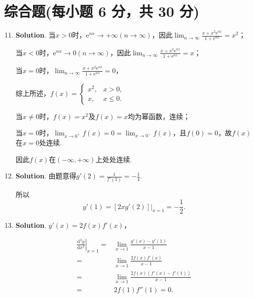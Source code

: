 \documentclass[../main.tex]{subfiles}
\begin{document}
\section{综合题(每小题 6 分，共 30 分)}
\begin{enumerate}
    \setcounter{enumi}{10}
    \item \textbf{Solution}. 当$x>0$时，$\mathrm{e}^{nx}\to+\infty(n\to\infty
              )$，因此$\lim_{n\to\infty}\frac{x+x^{2}\mathrm{e}^{nx}}{1+\mathrm{e}^{nx}}
              =x^{2}$；

          当$x<0$时，$\mathrm{e}^{nx}\to0(n\to\infty)$，因此$\lim_{n\to\infty}\frac{x+x^{2}\mathrm{e}^{nx}}{1+\mathrm{e}^{nx}}
              =x$；

          当$x=0$时，$\lim_{n\to\infty}\frac{x+x^{2}\mathrm{e}^{nx}}{1+\mathrm{e}^{nx}}
              =0$，

          综上所述，$f(x)=
              \begin{cases}
                  x^{2}, & x>0,    \\
                  x,     & x\leq0.
              \end{cases}$

          当$x\neq0$时，$f(x)=x^{2}$及$f(x)=x$均为幂函数，连续；

          当$x=0$时，$\lim_{x\to0^+}f(x)=0=\lim_{x\to0^-}f(x)$，且$f(0)=0$，故$f(x)$在$x
              =0$处连续.

          因此$f(x)$在$(-\infty,+\infty)$上处处连续.

    \item \textbf{Solution}. 由题意得$g'(2)=\frac{1}{f'(1)}=-\frac{1}{4}$.

          所以
          \[
              y'(1)=\left.[2xg'(2)]\right|_{x=1}=-\frac{1}{2}.
          \]

    \item \textbf{Solution}. $y'(x)=2f(x)f'(x)$，

          \[
              \begin{aligned}
                  \left.\frac{\mathrm{d}^2 y}{\mathrm{d}x^2}\right|_{x=1}= {} & \lim_{x\to1}\frac{y'(x)-y'(1)}{x-1}        \\
                  = {}                                                        & \lim_{x\to1}\frac{2f(x)f'(x)}{x-1}         \\
                  = {}                                                        & \lim_{x\to1}\frac{2f(x)(f'(x)-f'(1))}{x-1} \\
                  = {}                                                        & 2f(1)f''(1)=0.
              \end{aligned}
          \]


\end{enumerate}
\end{document}
